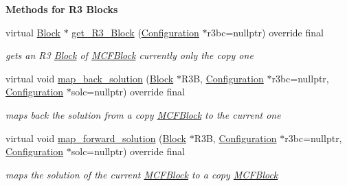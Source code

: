 \begin{Indent}\textbf{ Methods for R3 Blocks}\par
\begin{DoxyCompactItemize}
\item 
virtual \mbox{\hyperlink{class_s_m_spp__di__unipi__it_1_1_block}{Block}} $\ast$ \mbox{\hyperlink{class_s_m_spp__di__unipi__it_1_1_m_c_f_block_a36fbb6f247e14792e84f68e801c49783}{get\+\_\+\+R3\+\_\+\+Block}} (\mbox{\hyperlink{class_s_m_spp__di__unipi__it_1_1_configuration}{Configuration}} $\ast$r3bc=nullptr) override final
\begin{DoxyCompactList}\small\item\em gets an R3 \mbox{\hyperlink{class_s_m_spp__di__unipi__it_1_1_block}{Block}} of \mbox{\hyperlink{class_s_m_spp__di__unipi__it_1_1_m_c_f_block}{M\+C\+F\+Block}} currently only the copy one \end{DoxyCompactList}\item 
virtual void \mbox{\hyperlink{class_s_m_spp__di__unipi__it_1_1_m_c_f_block_aaab5f3727d85b0084832d6956470f21f}{map\+\_\+back\+\_\+solution}} (\mbox{\hyperlink{class_s_m_spp__di__unipi__it_1_1_block}{Block}} $\ast$R3B, \mbox{\hyperlink{class_s_m_spp__di__unipi__it_1_1_configuration}{Configuration}} $\ast$r3bc=nullptr, \mbox{\hyperlink{class_s_m_spp__di__unipi__it_1_1_configuration}{Configuration}} $\ast$solc=nullptr) override final
\begin{DoxyCompactList}\small\item\em maps back the solution from a copy \mbox{\hyperlink{class_s_m_spp__di__unipi__it_1_1_m_c_f_block}{M\+C\+F\+Block}} to the current one \end{DoxyCompactList}\item 
virtual void \mbox{\hyperlink{class_s_m_spp__di__unipi__it_1_1_m_c_f_block_af990663a09f7203179f903e91c6bb3f1}{map\+\_\+forward\+\_\+solution}} (\mbox{\hyperlink{class_s_m_spp__di__unipi__it_1_1_block}{Block}} $\ast$R3B, \mbox{\hyperlink{class_s_m_spp__di__unipi__it_1_1_configuration}{Configuration}} $\ast$r3bc=nullptr, \mbox{\hyperlink{class_s_m_spp__di__unipi__it_1_1_configuration}{Configuration}} $\ast$solc=nullptr) override final
\begin{DoxyCompactList}\small\item\em maps the solution of the current \mbox{\hyperlink{class_s_m_spp__di__unipi__it_1_1_m_c_f_block}{M\+C\+F\+Block}} to a copy \mbox{\hyperlink{class_s_m_spp__di__unipi__it_1_1_m_c_f_block}{M\+C\+F\+Block}} \end{DoxyCompactList}\item 

\end{DoxyCompactItemize}
\end{Indent}
